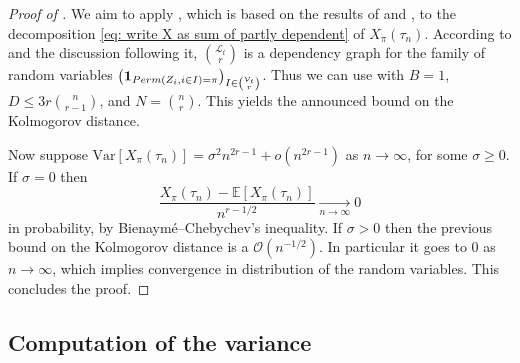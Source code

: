\documentclass{article}
\theoremstyle{remark}
\newcommand{\cv}[2]{\underset{#1\to#2}{\longrightarrow}}
\def\O{\mathcal{O}}
\newcommand{\mean}[1]{\mathbb{E}\left[#1\right]}
\newcommand{\var}[1]{\mathrm{Var}\left[#1\right]}
\newcommand{\One}[1]{\mathbf{1}_{#1}}
\newcommand{\perm}[1]{{\rm Perm}\left(#1\right)}
\def\L{\mathcal{L}}
\def\Vert{\mathcal{V}}
\begin{document}
\begin{proof}[Proof of ]
    We aim to apply \cite[Theorem~3.5]{H18}, which is based on the results of \cite{CR10} and \cite{R11}, to the decomposition \eqref{eq: write X as sum of partly dependent} of $X_\pi(\tau_n)$.
    According to  and the discussion following it, $\binom{\L_t}{r}$ is a dependency graph for the family of random variables $\left( \One{ \perm{Z_i,i\in I} = \pi} \right)_{I\in\binom{\Vert_t}{r}}$.
    Thus we can use \cite[Theorem~3.5]{H18} with $B=1$, $D\le 3r\binom{n}{r-1}$, and $N=\binom{n}{r}$.
    This yields the announced bound on the Kolmogorov distance.

    Now suppose $\var{X_\pi(\tau_n)}=\sigma^2 n^{2r-1} + o(n^{2r-1})$ as $n\to\infty$, for some $\sigma\ge0$.
    If $\sigma=0$ then
    \begin{equation*}
        \frac{X_\pi(\tau_n)-\mean{X_\pi(\tau_n)}}{n^{r-1/2}} \cv{n}{\infty} 0
    \end{equation*}
    in probability, by Bienaymé--Chebychev's inequality.
    If $\sigma>0$ then the previous bound on the Kolmogorov distance is a $\O(n^{-1/2})$.
    In particular it goes to $0$ as $n\to\infty$, which implies convergence in distribution of the random variables.
    This concludes the proof.
\end{proof}


\subsection{Computation of the variance}
\end{document}
